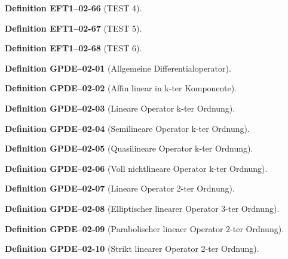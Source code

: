 \documentclass[10pt, letterpaper]{article}
\newcommand{\CustomHeading}[3]{%
  \par\medskip\noindent%
  \textbf{#1 #2} \textnormal{(#3)}.\enskip%
}
\newenvironment{DEF}[2]{\CustomHeading{Definition}{#1}{#2}}{}
\begin{document}
\begin{DEF}{EFT1--02-66}{TEST 4}
\end{DEF}

\begin{DEF}{EFT1--02-67}{TEST 5}
\end{DEF}

\begin{DEF}{EFT1--02-68}{TEST 6}
\end{DEF}

\begin{DEF}{GPDE--02-01}{Allgemeine Differentialoperator}
\end{DEF}

\begin{DEF}{GPDE--02-02}{Affin linear in k-ter Komponente}
\end{DEF}

\begin{DEF}{GPDE--02-03}{Lineare Operator k-ter Ordnung}
\end{DEF}

\begin{DEF}{GPDE--02-04}{Semilineare Operator k-ter Ordnung}
\end{DEF}

\begin{DEF}{GPDE--02-05}{Quasilineare Operator k-ter Ordnung}
\end{DEF}

\begin{DEF}{GPDE--02-06}{Voll nichtlineare Operator k-ter Ordnung}
\end{DEF}

\begin{DEF}{GPDE--02-07}{Lineare Operator 2-ter Ordnung}
\end{DEF}

\begin{DEF}{GPDE--02-08}{Elliptischer linearer Operator 3-ter Ordnung}
\end{DEF}

\begin{DEF}{GPDE--02-09}{Parabolischer lineaer Operator 2-ter Ordnung}
\end{DEF}

\begin{DEF}{GPDE--02-10}{Strikt linearer Operator 2-ter Ordnung}
\end{DEF}
\end{document}
